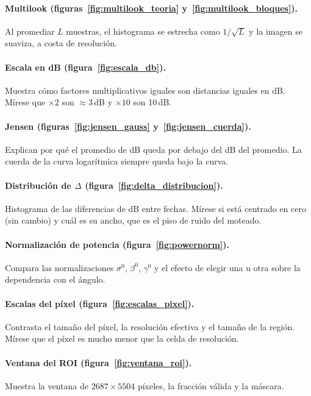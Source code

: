 \documentclass[11pt,a4paper]{article}
\begin{document}
\paragraph{Multilook (figuras~\ref{fig:multilook_teoria} y~\ref{fig:multilook_bloques}).} Al promediar $L$
muestras, el histograma se estrecha como $1/\sqrt L$ y la imagen se suaviza, a costa de resolución.

\paragraph{Escala en dB (figura~\ref{fig:escala_db}).} Muestra cómo factores multiplicativos iguales son
distancias iguales en dB. Mírese que $\times2$ son $\approx3$\,dB y $\times10$ son 10\,dB.

\paragraph{Jensen (figuras~\ref{fig:jensen_gauss} y~\ref{fig:jensen_cuerda}).} Explican por qué el promedio de
dB queda por debajo del dB del promedio. La cuerda de la curva logarítmica siempre queda bajo la curva.

\paragraph{Distribución de $\Delta$ (figura~\ref{fig:delta_distribucion}).} Histograma de las diferencias de
dB entre fechas. Mírese si está centrado en cero (sin cambio) y cuál es su ancho, que es el piso de ruido del
moteado.

\paragraph{Normalización de potencia (figura~\ref{fig:powernorm}).} Compara las normalizaciones $\sigma^0$,
$\beta^0$, $\gamma^0$ y el efecto de elegir una u otra sobre la dependencia con el ángulo.

\paragraph{Escalas del píxel (figura~\ref{fig:escalas_pixel}).} Contrasta el tamaño del píxel, la resolución
efectiva y el tamaño de la región. Mírese que el píxel es mucho menor que la celda de resolución.

\paragraph{Ventana del ROI (figura~\ref{fig:ventana_roi}).} Muestra la ventana de $2687\times5504$ píxeles,
la fracción válida y la máscara.
\end{document}

